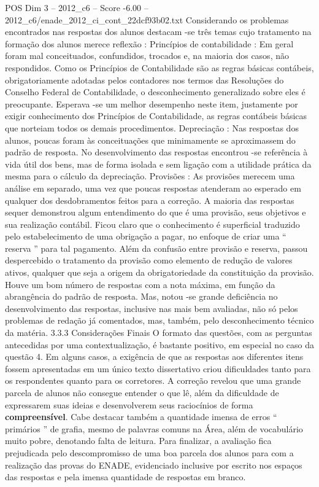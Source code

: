 \begin{textsample}{POS Dim 3 – 2012\_c6 – Score -6.00 – 2012\_c6/enade\_2012\_ci\_cont\_22dcf93b02.txt}
Considerando os problemas encontrados nas respostas dos alunos destacam -se três temas cujo tratamento na formação dos alunos merece reflexão : Princípios de contabilidade : Em geral foram mal conceituados, confundidos, trocados e, na maioria dos casos, não respondidos.
Como os Princípios de Contabilidade são as regras básicas contábeis, obrigatoriamente adotadas pelos contadores nos termos das Resoluções do Conselho Federal de Contabilidade, o desconhecimento generalizado sobre eles é preocupante.
Esperava -se um melhor desempenho neste item, justamente por exigir conhecimento dos Princípios de Contabilidade, as regras contábeis básicas que norteiam todos os demais procedimentos.
Depreciação : Nas respostas dos alunos, poucas foram às conceituações que minimamente se aproximassem do padrão de resposta.
No desenvolvimento das respostas encontrou -se referência à vida útil dos bens, mas de forma isolada e sem ligação com a utilidade prática da mesma para o cálculo da depreciação.
Provisões : As provisões merecem uma análise em separado, uma vez que poucas respostas atenderam ao esperado em qualquer dos desdobramentos feitos para a correção.
A maioria das respostas sequer demonstrou algum entendimento do que é uma provisão, seus objetivos e sua realização contábil.
Ficou claro que o conhecimento é superficial traduzido pelo estabelecimento de uma obrigação a pagar, no enfoque de criar uma “ reserva ” para tal pagamento.
Além da confusão entre provisão e reserva, passou despercebido o tratamento da provisão como elemento de redução de valores ativos, qualquer que seja a origem da obrigatoriedade da constituição da provisão.
Houve um bom número de respostas com a nota máxima, em função da abrangência do padrão de resposta.
Mas, notou -se grande deficiência no desenvolvimento das respostas, inclusive nas mais bem avaliadas, não só pelos problemas de redação já comentados, mas, também, pelo desconhecimento técnico da matéria. 3.3.3 Considerações Finais O formato das questões, com as perguntas antecedidas por uma contextualização, é bastante positivo, em especial no caso da questão 4.
Em alguns casos, a exigência de que as respostas aos diferentes itens fossem apresentadas em um único texto dissertativo criou dificuldades tanto para os respondentes quanto para os corretores.
A correção revelou que uma grande parcela de alunos não consegue entender o que lê, além da dificuldade de expressarem suas ideias e desenvolverem seus raciocínios de forma \textbf{compreensível}.
Cabe destacar também a quantidade imensa de erros “ primários ” de grafia, mesmo de palavras comuns na Área, além de vocabulário muito pobre, denotando falta de leitura.
Para finalizar, a avaliação fica prejudicada pelo descompromisso de uma boa parcela dos alunos para com a realização das provas do ENADE, evidenciado inclusive por escrito nos espaços das respostas e pela imensa quantidade de respostas em branco.

\end{textsample}
